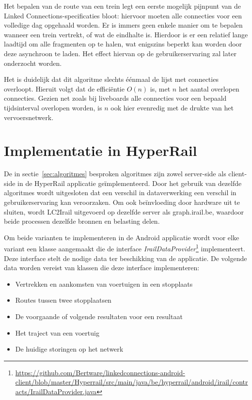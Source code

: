 Het bepalen van de route van een trein legt een eerste mogelijk pijnpunt van de Linked Connections-specificaties bloot: hiervoor moeten alle connecties voor een volledige dag opgehaald worden. Er is immers geen enkele manier om te bepalen wanneer een trein vertrekt, of wat de eindhalte is. Hierdoor is er een relatief lange laadtijd om alle fragmenten op te halen, wat enigszins beperkt kan worden door deze asynchroon te laden. Het effect hiervan op de gebruikerservaring zal later onderzocht worden.

Het is duidelijk dat dit algoritme slechts éénmaal de lijst met connecties overloopt. Hieruit volgt dat de efficiëntie $O(n)$ is, met $n$ het aantal overlopen connecties. Gezien net zoals bij liveboards alle connecties voor een bepaald tijdsinterval overlopen worden, is $n$ ook hier evenredig met de drukte van het vervoersnetwerk.

\section {Implementatie in HyperRail}
De in sectie~\ref{sec:algoritmes} besproken algoritmes zijn zowel server-side als client-side in de HyperRail applicatie geïmplementeerd. Door het gebruik van dezelfde algoritmes wordt uitgesloten dat een verschil in dataverwerking een verschil in gebruikerservaring kan veroorzaken. Om ook beïnvloeding door hardware uit te sluiten, wordt LC2Irail uitgevoerd op dezelfde server als graph.irail.be, waardoor beide processen dezelfde bronnen en belasting delen.

Om beide varianten te implementeren in de Android applicatie wordt voor elke variant een klasse aangemaakt die de interface \emph{IrailDataProvider}\footnote{\url{https://github.com/Bertware/linkedconnections-android-client/blob/master/Hyperrail/src/main/java/be/hyperrail/android/irail/contracts/IrailDataProvider.java}} implementeert. Deze interface stelt de nodige data ter beschikking van de applicatie. De volgende data worden vereist van klassen die deze interface implementeren:

\begin{itemize}
	\item Vertrekken en aankomsten van voertuigen in een stopplaats
	\item Routes tussen twee stopplaatsen
	\item De voorgaande of volgende resultaten voor een resultaat
	\item Het traject van een voertuig
	\item De huidige storingen op het netwerk
\end{itemize}

